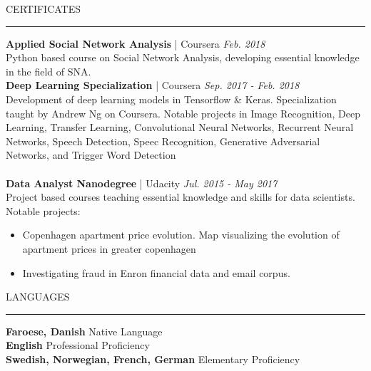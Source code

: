 \documentclass[12pt,a4paper]{article}
\newcommand{\textline}[3]{\normalsize{\textbf{#1} | #2 \hfill \textit{#3}}}
\newcommand{\headline}[1]{\Large \textcolor{myblue}{#1}}
\begin{document}
{\headline{CERTIFICATES}}
\vspace{0.2cm}
{\color{myblue}\hrule height 0.3mm}
\vspace{0.2cm}
    \textline{\normalsize{Applied Social Network Analysis}}{Coursera}{\normalsize{Feb. 2018}}\\
    Python based course on Social Network Analysis, developing essential knowledge in the field of SNA.
    \\

    \textline{\normalsize{Deep Learning Specialization}}{Coursera}{\normalsize{Sep. 2017 - Feb. 2018}}\\
    Development of deep learning models in Tensorflow \& Keras. Specialization taught by Andrew Ng on Coursera. Notable projects in Image Recognition, Deep Learning, Transfer Learning, Convolutional Neural Networks, Recurrent Neural Networks, Speech Detection, Speec Recognition, Generative Adversarial Networks, and Trigger Word Detection\\
    \\
    \textline{\normalsize{Data Analyst Nanodegree}}{Udacity}{\normalsize{Jul. 2015 - May 2017}} \\
    Project based courses teaching essential knowledge and skills for data scientists. Notable projects:
\begin{itemize}[label=\textcolor{myblue}{\textbullet}]
    \vspace{-0.3cm}
    \item Copenhagen apartment price evolution. Map visualizing the evolution of apartment prices in greater copenhagen
    \vspace{-0.3cm}
    \item Investigating fraud in Enron financial data and email corpus. 
\end{itemize}

{\headline{LANGUAGES}}
\vspace{0.2cm}
{\color{myblue}\hrule height 0.3mm}
\vspace{0.2cm}
\textbf{Faroese, Danish} \hfill Native Language\\
\textbf{English} \hfill Professional Proficiency\\
\textbf{Swedish, Norwegian, French, German} \hfill Elementary Proficiency
\end{document}
